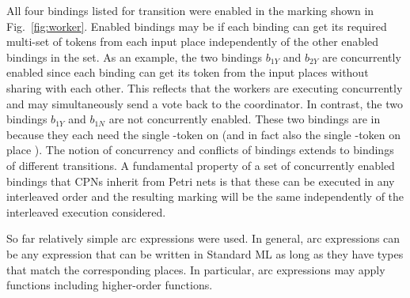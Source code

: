 All four bindings listed for transition 
were enabled in the marking shown in Fig.~\ref{fig:worker}. Enabled
bindings may be  if each binding can get
its required multi-set of tokens from each input place independently
of the other enabled bindings in the set. As an example, the two
bindings $b_{1Y}$ and $b_{2Y}$ are concurrently enabled since each
binding can get its token from the input places without sharing with
each other. This reflects that the workers are executing concurrently
and may simultaneously send a vote back to the coordinator. In
contrast, the two bindings $b_{1Y}$ and $b_{1N}$ are not concurrently
enabled. These two bindings are in  because they
each need the single -token on  (and in
fact also the single -token on place
). The notion of concurrency and conflicts of bindings
extends to bindings of different transitions. A fundamental property
of a set of concurrently enabled bindings that CPNs inherit from Petri
nets is that these can be executed in any interleaved order and the
resulting marking will be the same independently of the interleaved
execution considered.

 So far relatively simple arc expressions were used. In general, arc
 expressions can be any expression that can be written in Standard ML
 as long as they have types that match the corresponding places. In
 particular, arc expressions may apply functions including
 higher-order functions. 




